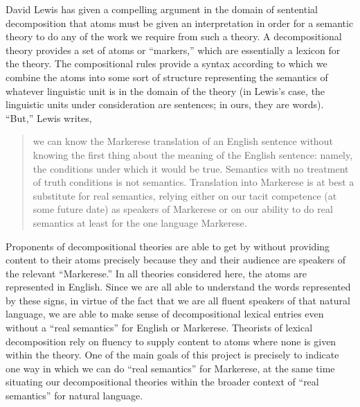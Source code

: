 David Lewis \cite{lewis_general_1970} has given a compelling argument in the domain of sentential decomposition that atoms must be given an interpretation in order for a semantic theory to do any of the work we require from such a theory. A decompositional theory provides a set of atoms or ``markers,'' which are essentially a lexicon for the theory. The compositional rules provide a syntax according to which we combine the atoms into some sort of structure representing the semantics of whatever linguistic unit is in the domain of the theory (in Lewis's case, the linguistic units under consideration are sentences; in ours, they are words). ``But,'' Lewis writes,
\begin{quote}
we can know the Markerese translation of an English sentence without knowing the first thing about the meaning of the English sentence: namely, the conditions under which it would be true. Semantics with no treatment of truth conditions is not semantics. Translation into Markerese is at best a substitute for real semantics, relying either on our tacit competence (at some future date) as speakers of Markerese or on our ability to do real semantics at least for the one language Markerese.
\end{quote}
Proponents of decompositional theories are able to get by without providing content to their atoms precisely because they and their audience are speakers of the relevant ``Markerese.'' In all theories considered here, the atoms are represented in English. Since we are all able to understand the words represented by these signs, in virtue of the fact that we are all fluent speakers of that natural language, we are able to make sense of decompositional lexical entries even without a ``real semantics'' for English or Markerese. Theorists of lexical decomposition rely on fluency to supply content to atoms where none is given within the theory. One of the main goals of this project is precisely to indicate one way in which we can do ``real semantics'' for Markerese, at the same time situating our decompositional theories within the broader context of ``real semantics'' for natural language.

